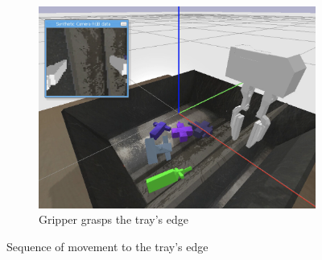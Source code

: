 \begin{enumerate}
\begin{figure}[!htbp]
\begin{subfigure}{0.35\textwidth}
        \end{subfigure}%
        \hspace*{\fill}   %
        \begin{subfigure}{0.33\textwidth}
            \includegraphics[width=\linewidth]{figures/failure/trayedge3}
            \caption{Gripper grasps the tray's edge} \label{fig:floor}
        \end{subfigure}%
        \hspace*{\fill}   %
        \caption{Sequence of movement to the tray's edge\label{fig:failTrayEdge}}
    \end{figure} 

\end{enumerate}